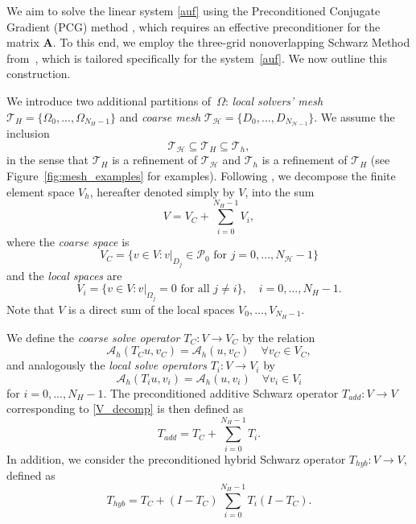 \documentclass[11pt]{article}
\theoremstyle{definition}
\theoremstyle{theorem}
\begin{document}
We aim to solve the linear system \eqref{auf} using the Preconditioned
Conjugate Gradient (PCG) method \cite[Section 9.2]{Saad}, which requires an
effective preconditioner for the matrix $\bm{A}$. To this end, we employ
the three-grid nonoverlapping Schwarz Method from~\cite{Przykry},
which is tailored specifically for the system~\eqref{auf}.
We now outline this construction.

We introduce two additional
partitions of~$\Omega$: \emph{local solvers' mesh} $\mathcal{T}_H=\{\Omega_0, ..., \Omega_{N_H-1}\}$ and
\emph{coarse mesh} $\mathcal{T}_{\mathcal{H}}=\{D_0, ..., D_{N_{\mathcal{H}-1}}\}$.
We assume the inclusion
\[
  \mathcal{T}_{\mathcal{H}}\subseteq \mathcal{T}_H\subseteq \mathcal{T}_h,
\]
in the sense that $\mathcal{T}_H$ is a refinement of $\mathcal{T}_{\mathcal{H}}$ and
$\mathcal{T}_h$ is a refinement of $\mathcal{T}_H$ (see Figure~\ref{fig:mesh_examples}
for examples). Following \cite{Przykry}, we decompose the finite element space $V_h$,
hereafter denoted simply by $V$, into the sum
\begin{equation}
  V = V_C + \sum_{i=0}^{N_H-1} V_i,\label{V_decomp}
\end{equation}
where the \emph{coarse space} is
\[
  V_C = \{v \in V : v|_{D_j}\in \mathcal{P}_0\text{ for } j=0,...,N_{\mathcal{H}}-1\}
\]
and the \emph{local spaces} are
\[
  V_i = \{v\in V : v|_{\Omega_j}=0 \text{ for all } j\neq i\},\quad i=0,...,N_H-1.
\]
Note that $V$ is a direct sum of the local spaces $V_0, ..., V_{N_H-1}$.

We define the \emph{coarse solve operator}
$T_C: V\to V_C$ by the relation
\begin{equation}
  \mathcal{A}_h(T_C u, v_C) = \mathcal{A}_h(u, v_C) \quad \forall v_C\in V_C,\label{T_C_def}
\end{equation}
and analogously the \emph{local solve operators} $T_i: V\to V_i$ by
\begin{equation}
  \mathcal{A}_h(T_i u, v_i) = \mathcal{A}_h(u, v_i) \quad \forall v_i\in V_i\label{T_i_def}
\end{equation}
for $i=0,...,N_H-1$. The preconditioned additive Schwarz operator $T_{add}:V\to V$
corresponding to \eqref{V_decomp} is then defined as
\begin{equation}
  T_{add} = T_C + \sum_{i=0}^{N_H-1} T_i.\label{T_def}
\end{equation}
In addition, we consider
the preconditioned hybrid Schwarz operator $T_{hyb}:V\to V$, defined as
\begin{equation}
  T_{hyb} = T_C + \left(I - T_C\right) \sum_{i=0}^{N_H-1} T_i(I-T_C).\label{T_hyb_def}
\end{equation}
\end{document}
